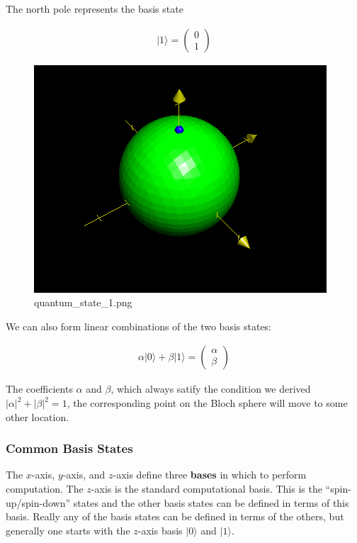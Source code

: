 \documentclass[11pt]{article}
\makeatletter
\def\maxwidth{\ifdim\Gin@nat@width>\linewidth\linewidth
    \else\Gin@nat@width\fi}
\let\Oldincludegraphics\includegraphics
\renewcommand{\includegraphics}[1]{\Oldincludegraphics[width=.8\maxwidth]{#1}}
\makeatother
\begin{document}
    The north pole represents the basis state

\begin{align}
|1\rangle = \begin{pmatrix} 0\\1 \end{pmatrix}
\end{align}

    \begin{figure}
\centering
\includegraphics{quantum_state_1.png}
\caption{quantum\_state\_1.png}
\end{figure}

    We can also form linear combinations of the two basis states:

\begin{align}
\alpha |0\rangle + \beta |1 \rangle = \begin{pmatrix} \alpha \\ \beta \end{pmatrix}
\end{align}

The coefficients \(\alpha\) and \(\beta\), which always satify the
condition we derived \(|\alpha|^2+|\beta|^2 = 1\), the corresponding
point on the Bloch sphere will move to some other location.

    \hypertarget{common-basis-states}{%
\subsubsection{Common Basis States}\label{common-basis-states}}

    The \(x\)-axis, \(y\)-axis, and \(z\)-axis define three \textbf{bases}
in which to perform computation. The \(z\)-axis is the standard
computational basis. This is the ``spin-up/spin-down'' states and the
other basis states can be defined in terms of this basis. Really any of
the basis states can be defined in terms of the others, but generally
one starts with the \(z\)-axis basis \(|0\rangle\) and \(|1\rangle\).
\end{document}
